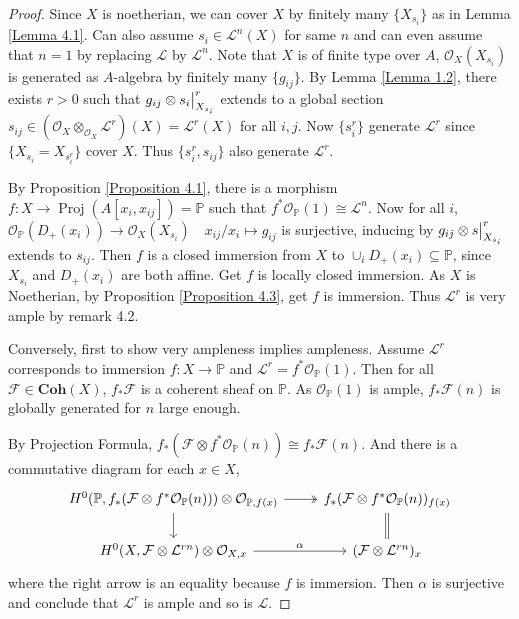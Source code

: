 \documentclass{ctexart}
\newcommand{\proj}{\operatorname{Proj}}
\newcommand{\coherent}{\mathbf{Coh}}
\begin{document}
\begin{proof}
    Since $X$ is noetherian, we can cover $X$ by finitely many $\{X_{s_{i}}\}$ as in Lemma \ref{Lemma 4.1}.
    Can also assume $s_{i}\in \mathcal{L}^{n}(X)$ for same $n$ and can even assume that $n = 1$ by replacing $\mathcal{L}$ by $\mathcal{L}^{n}$.
    Note that $X$ is of finite type over $A$, $\mathcal{O}_{X}(X_{s_{i}})$ is generated as $A$-algebra by finitely many $\{g_{ij}\}$.
    By Lemma \ref{Lemma 1.2}, there exists $r > 0$ such that $g_{ij} \otimes s_{i}\big{|}_{X_{s_{i}}}^{r}$ extends to a global section $s_{ij}\in (\mathcal{O}_{X} \otimes_{\mathcal{O}_{X}} \mathcal{L}^{r})(X) = \mathcal{L}^{r}(X)$ for all $i,j$.
    Now $\{s_{i}^{r}\}$ generate $\mathcal{L}^{r}$ since $\{X_{s_{i}} = X_{s_{i}^{r}}\}$ cover $X$.
    Thus $\{s_{i}^{r}, s_{ij}\}$ also generate $\mathcal{L}^{r}$.
    \par
    By Proposition \ref{Proposition 4.1}, there is a morphism $f: X \longrightarrow \proj(A[x_{i}, x_{ij}]) = \mathbb{P}$ such that $f^{\ast}\mathcal{O}_{\mathbb{P}}(1) \cong \mathcal{L}^{n}$.
    Now for all $i$, $\mathcal{O}_{\mathbb{P}}(D_{+}(x_{i})) \longrightarrow \mathcal{O}_{X}(X_{s_{i}})\quad x_{ij}/x_{i} \longmapsto g_{ij}$ is surjective, inducing by $g_{ij} \otimes s\big{|}_{X_{s_{i}}}^{r}$ extends to $s_{ij}$.
    Then $f$ is a closed immersion from $X$ to $\cup_{i} D_{+}(x_{i}) \subseteq \mathbb{P}$, since $X_{s_{i}}$ and $D_{+}(x_{i})$ are both affine.
    Get $f$ is locally closed immersion.
    As $X$ is Noetherian, by Proposition \ref{Proposition 4.3}, get $f$ is immersion.
    Thus $\mathcal{L}^{r}$ is very ample by remark 4.2.
    \par
    Conversely, first to show very ampleness implies ampleness.
    Assume $\mathcal{L}^{r}$ corresponds to immersion $f: X \rightarrow \mathbb{P}$ and $\mathcal{L}^{r} = f^{\ast}\mathcal{O}_{\mathbb{P}}(1)$.
    Then for all $\mathcal{F}\in \coherent (X)$, $f_{\ast}\mathcal{F}$ is a coherent sheaf on $\mathbb{P}$.
    As $\mathcal{O}_{\mathbb{P}}(1)$ is ample, $f_{\ast}\mathcal{F}(n)$ is globally generated for $n$ large enough.
    \par
    By Projection Formula, $f_{\ast}(\mathcal{F} \otimes f^{\ast}\mathcal{O}_{\mathbb{P}}(n)) \cong f_{\ast}\mathcal{F}(n)$.
    And there is a commutative diagram for each $x\in X$,
    \begin{equation}
        \begin{tikzcd}
            H^{0}(\mathbb{P}, f_{\ast}(\mathcal{F} \otimes f^{\ast}\mathcal{O}_{\mathbb{P}}(n))) \otimes \mathcal{O}_{\mathbb{P}, f(x)} \arrow[r, twoheadrightarrow] \arrow[d] &
            f_{\ast}(\mathcal{F} \otimes f^{\ast}\mathcal{O}_{\mathbb{P}}(n))_{f(x)} \arrow[d, equal] \\
            H^{0}(X, \mathcal{F} \otimes \mathcal{L}^{rn}) \otimes \mathcal{O}_{X, x} \arrow[r, "\alpha"] &
            (\mathcal{F} \otimes \mathcal{L}^{rn})_{x}
        \end{tikzcd}
    \end{equation}
    where the right arrow is an equality because $f$ is immersion.
    Then $\alpha$ is surjective and conclude that $\mathcal{L}^{r}$ is ample and so is $\mathcal{L}$.
\end{proof}
\end{document}
